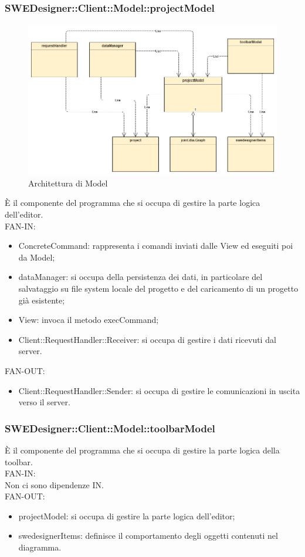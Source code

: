 \documentclass[../PianoDiQualifica.tex]{subfiles}
\begin{document}
		\subsubsection{SWEDesigner::Client::Model::projectModel}
			\begin{figure}[H]\label{fig:Model}
				\centering
				\includegraphics[scale=0.46]{Immagini/DiagrammaArchitettura/MainModel.png}
				\caption{Architettura di Model}
			\end{figure}
		È il componente del programma che si occupa di gestire la parte logica dell’editor.\\
		FAN-IN:
		\begin{itemize}
			\item ConcreteCommand: rappresenta i comandi inviati dalle View ed eseguiti poi da Model;
			\item dataManager: si occupa della persistenza dei dati, in particolare del salvataggio su file system locale del progetto e del caricamento di un progetto già esistente;
			\item View: invoca il metodo execCommand;
			\item Client::RequestHandler::Receiver: si occupa di gestire i dati ricevuti dal server.
		\end{itemize}
		FAN-OUT:
		\begin{itemize}
			\item Client::RequestHandler::Sender: si occupa di gestire le comunicazioni in uscita verso il server.
		\end{itemize}
		
		\subsubsection{SWEDesigner::Client::Model::toolbarModel}
		È il componente del programma che si occupa di gestire la parte logica della toolbar.\\
		FAN-IN:\\
		Non ci sono dipendenze IN. \\
		FAN-OUT:
		\begin{itemize}
			\item projectModel: si occupa di gestire la parte logica dell'editor;
			\item swedesignerItems: definisce il comportamento degli oggetti contenuti nel diagramma.
		\end{itemize}
	
\end{document}
